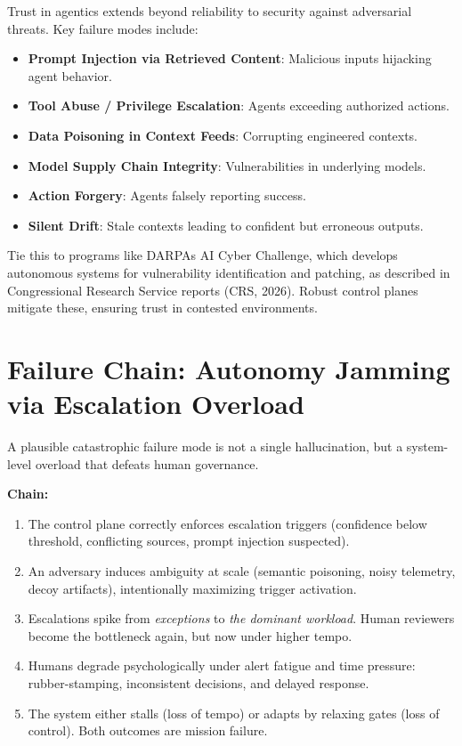 \documentclass[11pt]{article}
\begin{document}
Trust in agentics extends beyond reliability to security against adversarial threats. Key failure modes include:

\begin{itemize}
\item
  \textbf{Prompt Injection via Retrieved Content}: Malicious inputs hijacking agent behavior.
\item
  \textbf{Tool Abuse / Privilege Escalation}: Agents exceeding authorized actions.
\item
  \textbf{Data Poisoning in Context Feeds}: Corrupting engineered contexts.
\item
  \textbf{Model Supply Chain Integrity}: Vulnerabilities in underlying models.
\item
  \textbf{Action Forgery}: Agents falsely reporting success.
\item
  \textbf{Silent Drift}: Stale contexts leading to confident but erroneous outputs.
\end{itemize}

Tie this to programs like DARPA\textquotesingle s AI Cyber Challenge, which develops autonomous systems for vulnerability identification and patching, as described in Congressional Research Service reports (CRS, 2026). Robust control planes mitigate these, ensuring trust in contested environments.


\section{Failure Chain: Autonomy Jamming via Escalation Overload}\label{failure-chain-autonomy-jamming}

A plausible catastrophic failure mode is not a single hallucination, but a system-level overload that defeats human governance.

\textbf{Chain:}
\begin{enumerate}
\item The control plane correctly enforces escalation triggers (confidence below threshold, conflicting sources, prompt injection suspected).
\item An adversary induces ambiguity at scale (semantic poisoning, noisy telemetry, decoy artifacts), intentionally maximizing trigger activation.
\item Escalations spike from \emph{exceptions} to \emph{the dominant workload}. Human reviewers become the bottleneck again, but now under higher tempo.
\item Humans degrade psychologically under alert fatigue and time pressure: rubber-stamping, inconsistent decisions, and delayed response.
\item The system either stalls (loss of tempo) or adapts by relaxing gates (loss of control). Both outcomes are mission failure.
\end{enumerate}
\end{document}
